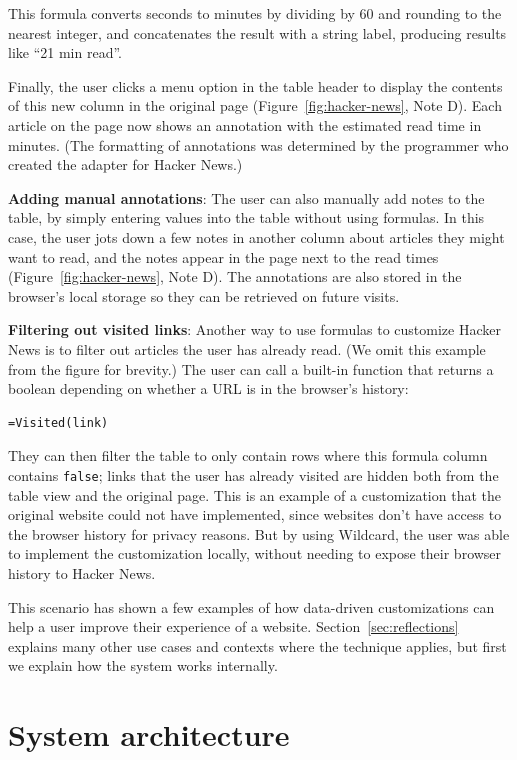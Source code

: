 \documentclass[sigplan,screen,10pt,anonymous,review]{acmart}
\begin{document}
This formula converts seconds to minutes by dividing by 60 and rounding
to the nearest integer, and concatenates the result with a string label,
producing results like ``21 min read''.

Finally, the user clicks a menu option in the table header to display
the contents of this new column in the original page
(Figure~\ref{fig:hacker-news}, Note D). Each article on the page now
shows an annotation with the estimated read time in minutes. (The
formatting of annotations was determined by the programmer who created
the adapter for Hacker News.)

\textbf{Adding manual annotations}: The user can also manually add notes
to the table, by simply entering values into the table without using
formulas. In this case, the user jots down a few notes in another column
about articles they might want to read, and the notes appear in the page
next to the read times (Figure~\ref{fig:hacker-news}, Note D). The
annotations are also stored in the browser's local storage so they can
be retrieved on future visits.

\textbf{Filtering out visited links}: Another way to use formulas to
customize Hacker News is to filter out articles the user has already
read. (We omit this example from the figure for brevity.) The user can
call a built-in function that returns a boolean depending on whether a
URL is in the browser's history:

\begin{verbatim}
=Visited(link)
\end{verbatim}

They can then filter the table to only contain rows where this formula
column contains \texttt{false}; links that the user has already visited
are hidden both from the table view and the original page. This is an
example of a customization that the original website could not have
implemented, since websites don't have access to the browser history for
privacy reasons. But by using Wildcard, the user was able to implement
the customization locally, without needing to expose their browser
history to Hacker News.

This scenario has shown a few examples of how data-driven customizations
can help a user improve their experience of a website.
Section~\ref{sec:reflections} explains many other use cases and contexts
where the technique applies, but first we explain how the system works
internally.

\hypertarget{sec:architecture}{%
\section{System architecture}\label{sec:architecture}}
\end{document}
